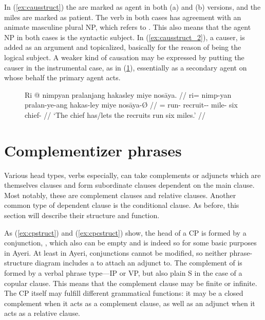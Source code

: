 In (\ref{ex:causstruct}) the  are
marked as agent in both (a) and (b) versions, and the 
{miles} are marked as patient. The verb in both cases has agreement with an
animate masculine plural NP, which refers to . This
also means that the agent NP in both cases is the syntactic subject. In
(\ref{ex:causstruct_2}), a causer,  is added as an
argument and topicalized, basically for the reason of being the logical
subject. A weaker kind of causation may be expressed by putting the causer in
the instrumental case, as in (\ref{ex:causinst}), essentially as a secondary
agent on whose behalf the primary agent acts.

\begin{figure}
\ex\label{ex:causinst}%
\begingl
	\gla Ri @ nimpyan pralanjang hakasley miye nosāya. //
	\glb ri= nimp-yan pralan-ye-ang hakas-ley miye nosāya-Ø //
	\glc \InsT{}= run-\TplM{} recruit-\Pl{}-\Aarg{} mile-\PargI{} six
		chief-\Top{} //
	\glft `The chief has/lets the recruits run six miles.' //
\endgl
\xe
\end{figure}


\section{Complementizer phrases}
\label{sec:cps}

Various head types, verbs especially, can take complements or adjuncts which
are themselves clauses and form subordinate clauses dependent on the main
clause. Most notably, these are complement clauses and relative clauses.
Another common type of dependent clause is the conditional clause. As before,
this section will describe their structure and function.

As (\ref{ex:cpstruct}) and (\ref{ex:cpcstruct}) show, the head of a
CP is formed by a conjunction, , which also can be
empty and is indeed so for some basic purposes in Ayeri. At least in Ayeri,
conjunctions cannot be modified, so neither phrase-structure diagram includes a
 to attach an adjunct to. The complement of  is formed by a
verbal phrase type---IP or VP, but also plain S in the case of a copular clause.
This means that the complement clause may be finite or infinite. The CP itself
may fulfill different grammatical functions: it may be a closed complement when
it acts as a complement clause, as well as an adjunct when it acts as a relative
clause.

